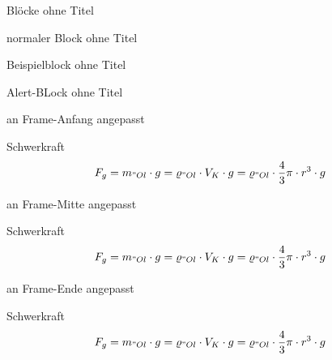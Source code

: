 \begin{frame}{Blöcke ohne Titel}
    \begin{block}{}
        normaler Block ohne Titel
    \end{block}
    \begin{exampleblock}{}
        Beispielblock ohne Titel
    \end{exampleblock}
    \begin{alertblock}{}
        Alert-BLock ohne Titel
    \end{alertblock}
\end{frame}
\begin{frame}[t]{an Frame-Anfang angepasst}
    \begin{block}{Schwerkraft}
        \begin{align*}
            F_g = m_{"Ol}\cdot g = \varrho_{"Ol} \cdot V_K \cdot g = \varrho_{"Ol} \cdot \frac{4}{3}\pi \cdot r^3 \cdot g 
        \end{align*}
    \end{block}
\end{frame}

\begin{frame}[c]{an Frame-Mitte angepasst}
    \begin{block}{Schwerkraft}
        \begin{align*}
            F_g = m_{"Ol}\cdot g = \varrho_{"Ol} \cdot V_K \cdot g = \varrho_{"Ol} \cdot \frac{4}{3}\pi \cdot r^3 \cdot g 
        \end{align*}
    \end{block}
\end{frame}

\begin{frame}[b]{an Frame-Ende angepasst}
    \begin{block}{Schwerkraft}
        \begin{align*}
            F_g = m_{"Ol}\cdot g = \varrho_{"Ol} \cdot V_K \cdot g = \varrho_{"Ol} \cdot \frac{4}{3}\pi \cdot r^3 \cdot g 
        \end{align*}
    \end{block}
\end{frame}

